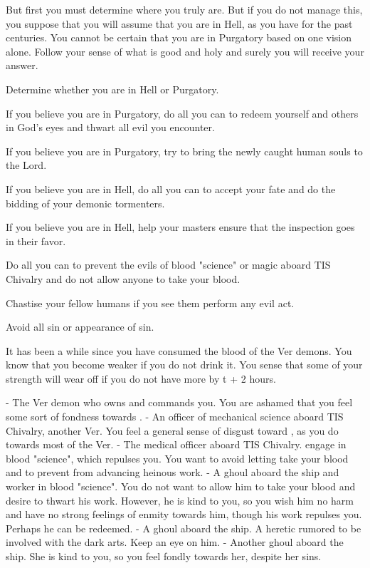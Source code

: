 \documentclass[char]{guildcamp4}
\begin{document}
But first you must determine where you truly are. But if you do not manage this, you suppose that you will assume that you are in Hell, as you have for the past centuries. You cannot be certain that you are in Purgatory based on one vision alone. Follow your sense of what is good and holy and surely you will receive your answer.

\begin{itemz}[Goals]
	\item Determine whether you are in Hell or Purgatory.
	\item If you believe you are in Purgatory, do all you can to redeem yourself and others in God's eyes and thwart all evil you encounter.
	\item If you believe you are in Purgatory, try to bring the newly caught human souls to the Lord.
	\item If you believe you are in Hell, do all you can to accept your fate and do the bidding of your demonic tormenters.
	\item If you believe you are in Hell, help your masters ensure that the inspection goes in their favor.
	\item Do all you can to prevent the evils of blood "science" or magic aboard TIS Chivalry and do not allow anyone to take your blood.
	\item Chastise your fellow humans if you see them perform any evil act.
	\item Avoid all sin or appearance of sin.
\end{itemz}

\begin{itemz}[Notes]
	\item It has been a while since you have consumed the blood of the Ver demons. You know that you become weaker if you do not drink it. You sense that some of your strength will wear off if you do not have more by t + 2 hours.
\end{itemz}

\begin{contacts}
	\contact{\cVone{}} - The Ver demon who owns and commands you. You are ashamed that you feel some sort of fondness towards \cVone{\them}.
	\contact{\cVtwo{}} - An officer of mechanical science aboard TIS Chivalry, another Ver. You feel a general sense of disgust toward \cVtwo{\them}, as you do towards most of the Ver.
	\contact{\cVthree{}} - The medical officer aboard TIS Chivalry. \cVthree{\They} engage in blood "science", which repulses you. You want to avoid letting \cVthree{\them} take your blood and to prevent \cVthree{\them} from advancing \cVthree{\their} heinous work.
	\contact{\cJames{}} - A ghoul aboard the ship and worker in blood "science". You do not want to allow him to take your blood and desire to thwart his work. However, he is kind to you, so you wish him no harm and have no strong feelings of enmity towards him, though his work repulses you. Perhaps he can be redeemed.
	\contact{\cRasputin{}} - A ghoul aboard the ship. A heretic rumored to be involved with the dark arts. Keep an eye on him.  
	\contact{\cJulie{}} - Another ghoul aboard the ship. She is kind to you, so you feel fondly towards her, despite her sins. 
\end{contacts}

\end{document}

